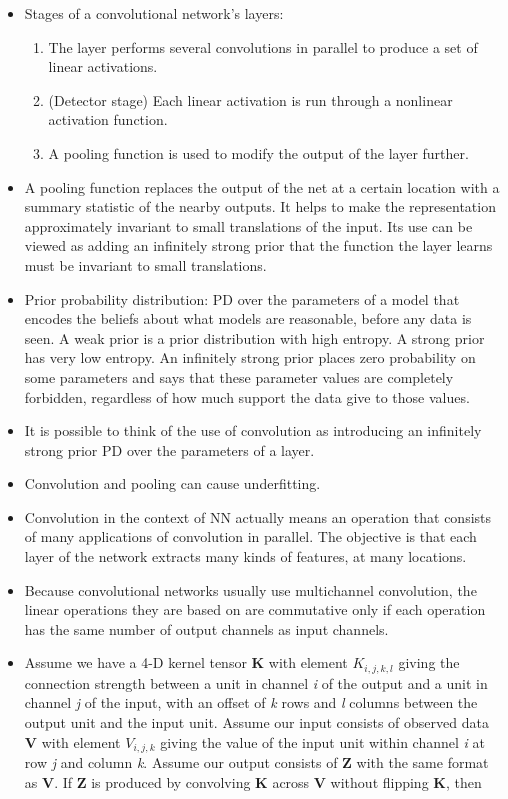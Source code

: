 \documentclass{article}
\begin{document}
\begin{itemize}
\item Stages of a convolutional network's layers:
\begin{enumerate}
\item The layer performs several convolutions in parallel to produce a set of linear activations.
\item (Detector stage) Each linear activation is run through a nonlinear activation function.
\item A pooling function is used to modify the output of the layer further.
\end{enumerate}
\item A pooling function replaces the output of the net at a certain location with a summary statistic of the nearby outputs. It helps to make the representation approximately invariant to small translations of the input. Its use can be viewed as adding an infinitely strong prior that the function the layer learns must be invariant to small translations.
\item Prior probability distribution: PD over the parameters of a model that encodes the beliefs about what models are reasonable, before any data is seen. A weak prior is a prior distribution with high entropy. A strong prior has very low entropy. An infinitely strong prior places zero probability on some parameters and says that these parameter values are completely forbidden, regardless of how much support the data give to those values.
\item It is possible to think of the use of convolution as introducing an infinitely strong prior PD over the parameters of a layer.
\item Convolution and pooling can cause underfitting.
\item Convolution in the context of NN actually means an operation that consists of many applications of convolution in parallel. The objective is that each layer of the network extracts many kinds of features, at many locations.
\item Because convolutional networks usually use multichannel convolution, the linear operations they are based on are commutative only if each operation has the same number of output channels as input channels.
\item Assume we have a 4-D kernel tensor \textbf{K} with element \(K_{i, j,k,l}\) giving the connection strength between a unit in channel \textit{i} of the output and a unit in channel \textit{j} of the input, with an offset of \textit{k} rows and \textit{l} columns between the output unit and the input unit. Assume our input consists of observed data \textbf{V} with element \(V_{i,j,k}\) giving the value of the input unit within channel \textit{i} at row \textit{j} and column \textit{k}. Assume our output consists of \textbf{Z} with the same format as \textbf{V}. If \textbf{Z} is produced by convolving \textbf{K} across \textbf{V} without flipping \textbf{K}, then 

\end{itemize}
\end{document}
